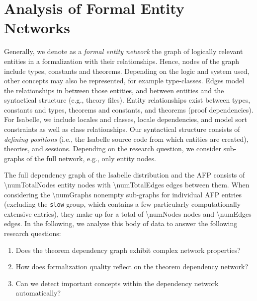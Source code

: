 \section{Analysis of Formal Entity Networks}\label{sec:network}
Generally, we denote as a \emph{formal entity network} the graph of logically relevant entities in a formalization with their relationships.
Hence, nodes of the graph include types, constants and theorems.
Depending on the logic and system used,
other concepts may also be represented,
for example type-classes.
Edges model the relationships in between those entities,
and between entities and the syntactical structure (e.g., theory files).
Entity relationships exist between types, constants and types, theorems and constants, and theorems (proof dependencies).
For Isabelle,
we include locales and classes, locale dependencies,
and model sort constraints as well as class relationships.
Our syntactical structure consists of \emph{defining positions}
(i.e., the Isabelle source code from which entities are created),
theories, and sessions.
Depending on the research question, we consider sub-graphs of the full network, e.g., only entity nodes.

The full dependency graph of the Isabelle distribution and the AFP consists of \SI[round-mode=places,round-precision=1]{\numTotalNodes}{\million} entity nodes with \SI[round-mode=places,round-precision=1]{\numTotalEdges}{\million} edges between them.
When considering the \num{\numGraphs} nonempty sub-graphs for individual AFP entries (excluding the \texttt{slow} group, which contains a few particularly computationally extensive entries),
they make up for a total of \SI[round-mode=places,round-precision=1]{\numNodes}{\million} nodes and \SI[round-mode=places,round-precision=1]{\numEdges}{\million} edges.
In the following, we analyze this body of data to answer the following research questions:

\begin{enumerate}[label=\bfseries{RQ\arabic*}:, leftmargin=*]
\item Does the theorem dependency graph exhibit complex network properties?
\item How does formalization quality reflect on the theorem dependency network?
\item Can we detect important concepts within the dependency network automatically?
\end{enumerate}


